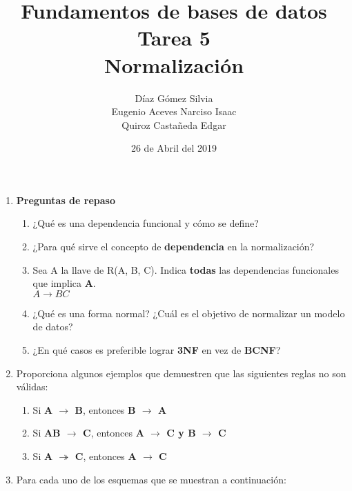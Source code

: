 \documentclass{article}
\begin{document}
    \title{
        Fundamentos de bases de datos \\
        Tarea 5 \\
        Normalización
    }
    \author{
        Díaz Gómez Silvia \\
        Eugenio Aceves Narciso Isaac \\
        Quiroz Castañeda Edgar
    }
    \date {
        26 de Abril del 2019    
    }
    \maketitle
    
    \begin{enumerate}
    	
    
    \item { \textbf{Preguntas de repaso}}
    \begin{enumerate}[label = \alph*.]
        \item ¿Qué es una dependencia funcional y cómo se define?
        \item ¿Para qué sirve el concepto de \textbf{dependencia} en la normalización?
        \item Sea A la llave de R(A, B, C). Indica \textbf{todas} las dependencias funcionales que implica \textbf{A}. \\
        $A \rightarrow BC$\\
        
        \item ¿Qué es una forma normal? ¿Cuál es el objetivo de normalizar un modelo de datos?
        \item ¿En qué casos es preferible lograr \textbf{3NF} en vez de \textbf{BCNF}?
    \end{enumerate}

    \item
    Proporciona algunos ejemplos que demuestren que las siguientes reglas no son válidas:
    \begin{enumerate}
    	\item Si \textbf{A $\rightarrow$ B}, entonces  \textbf{B $\rightarrow$ A}
    	\item Si \textbf{AB $\rightarrow$ C}, entonces  \textbf{A $\rightarrow$ C y B $\rightarrow$ C}
    	\item Si \textbf{A $\twoheadrightarrow$ C}, entonces \textbf{A $\rightarrow$ C}
    \end{enumerate}
       
    \item Para cada uno de los esquemas que se muestran a continuación:
    

\end{enumerate}
\end{document}
